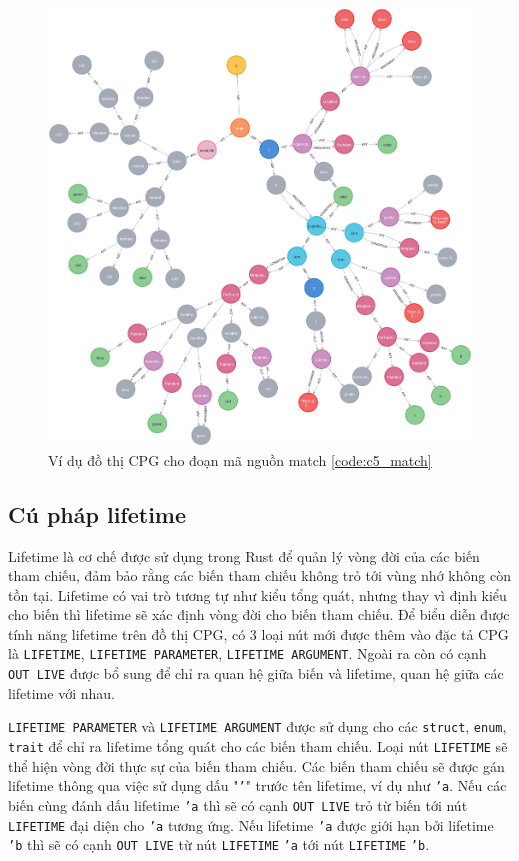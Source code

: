 \begin{figure}[H]
    \includegraphics[width=1\columnwidth]{figures/c5/c5_match.png}
    \centering
    \caption{Ví dụ đồ thị CPG cho đoạn mã nguồn match \ref{code:c5_match}}
    \label{img:c5_match}
\end{figure}

\subsection{Cú pháp lifetime}

Lifetime là cơ chế được sử dụng trong Rust để quản lý vòng đời của các biến tham chiếu, đảm bảo rằng các biến tham chiếu không trỏ tới vùng nhớ không còn tồn tại.
Lifetime có vai trò tương tự như kiểu tổng quát, nhưng thay vì định kiểu cho biến thì lifetime sẽ xác định vòng đời cho biến tham chiếu.
Để biểu diễn được tính năng lifetime trên đồ thị CPG, có 3 loại nút mới được thêm vào đặc tả CPG là \texttt{LIFETIME}, \texttt{LIFETIME PARAMETER}, \texttt{LIFETIME ARGUMENT}.
Ngoài ra còn có cạnh \texttt{OUT LIVE} được bổ sung để chỉ ra quan hệ giữa biến và lifetime, quan hệ giữa các lifetime với nhau.

\texttt{LIFETIME PARAMETER} và \texttt{LIFETIME ARGUMENT} được sử dụng cho các \texttt{struct}, \texttt{enum}, \texttt{trait} để chỉ ra lifetime tổng quát cho các biến tham chiếu.
Loại nút \texttt{LIFETIME} sẽ thể hiện vòng đời thực sự của biến tham chiếu.
Các biến tham chiếu sẽ được gán lifetime thông qua việc sử dụng dấu "\texttt{'}" trước tên lifetime, ví dụ như \texttt{'a}.
Nếu các biến cùng đánh dấu lifetime \texttt{'a} thì sẽ có cạnh \texttt{OUT LIVE} trỏ từ biến tới nút \texttt{LIFETIME} đại diện cho \texttt{'a} tương ứng.
Nếu lifetime \texttt{'a} được giới hạn bởi lifetime \texttt{'b} thì sẽ có cạnh \texttt{OUT LIVE} từ nút \texttt{LIFETIME} \texttt{'a} tới nút \texttt{LIFETIME} \texttt{'b}.

